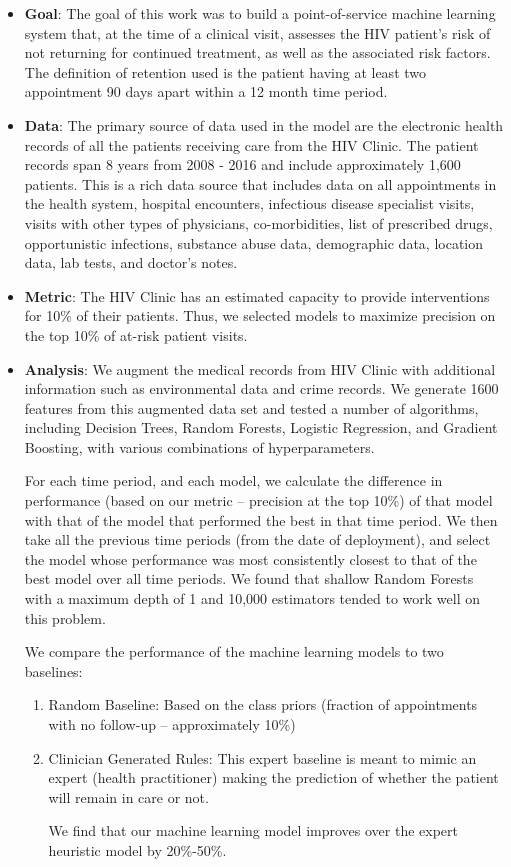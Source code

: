 \begin{itemize}
\item \textbf{Goal}: The goal of this work was to build a point-of-service machine learning system that, at the time of a clinical visit, assesses the HIV patient's risk of not returning for continued treatment, as well as the associated risk factors. The definition of retention used is the patient having at least two appointment 90 days apart within a 12 month time period. 

\item \textbf{Data}: The primary source of data used in the model are the electronic health records of all the patients receiving care from the HIV Clinic. The patient records span 8 years from 2008 - 2016 and include approximately 1,600 patients. This is a rich data source that includes data on all appointments in the health system, hospital encounters, infectious disease specialist visits, visits with other types of physicians, co-morbidities, list of prescribed drugs, opportunistic infections, substance abuse data, demographic data, location data, lab tests, and doctor's notes. 
\item \textbf{Metric}: The HIV Clinic has an estimated capacity to provide interventions for 10\% of their patients. Thus, we selected models to maximize precision on the top 10\% of at-risk patient visits. 
\item \textbf{Analysis}: We augment the medical records from HIV Clinic with additional information such as environmental data and crime records. We generate 1600 features from this augmented data set and tested a number of algorithms, including Decision Trees, Random Forests, Logistic Regression, and Gradient Boosting, with various combinations of hyperparameters. 

For each time period, and each model, we calculate the difference in performance (based on our metric -- precision at the top 10\%) of that model with that of the model that performed the best in that time period. We then take all the previous time periods (from the date of deployment), and select the model whose performance was most consistently closest to that of the best model over all time periods. We found that shallow Random Forests with a maximum depth of 1 and 10,000 estimators tended to work well on this problem.

We compare the performance of the machine learning models to two baselines:
\begin{enumerate}
\item Random Baseline: Based on the class priors (fraction of appointments with no follow-up -- approximately 10\%)
\item Clinician Generated Rules: This expert baseline is meant to mimic an expert (health practitioner) making the prediction of whether the patient will remain in care or not.

We find that our machine learning model improves over the expert heuristic model by 20\%-50\%.
\end{enumerate}
\end{itemize}

